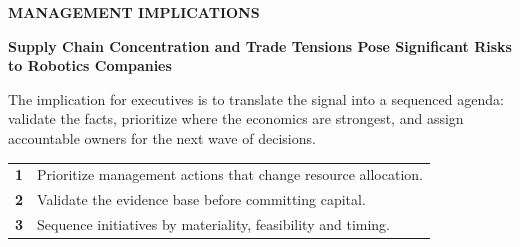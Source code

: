 \documentclass[10pt,a4paper]{article}
\begin{document}
\vspace{6pt}{\textcolor{BOBlue}{\scriptsize\bfseries STRATEGIC POSITIONING MAP}}\par
\begin{center}
\end{center}

\clearpage
{\textcolor{BOBlue}{\scriptsize\bfseries MANAGEMENT IMPLICATIONS}}\par\vspace{-1pt}
{\Large\sffamily\bfseries\color{BONavy} Supply Chain Concentration and Trade Tensions Pose Significant Risks to Robotics Companies}\par\vspace{4pt}
{\small The implication for executives is to translate the signal into a sequenced agenda: validate the facts, prioritize where the economics are strongest, and assign accountable owners for the next wave of decisions.}\par
\begin{tabularx}{\linewidth}{p{10mm}Y}
\textcolor{BOBlue}{\bfseries 1} & Prioritize management actions that change resource allocation. \\[5pt]
\textcolor{BOBlue}{\bfseries 2} & Validate the evidence base before committing capital. \\[5pt]
\textcolor{BOBlue}{\bfseries 3} & Sequence initiatives by materiality, feasibility and timing. \\[5pt]
\end{tabularx}
\vspace{6pt}
\end{document}
